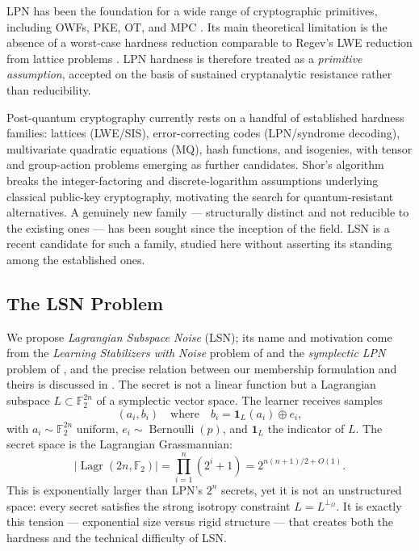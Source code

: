 \documentclass[11pt,a4paper]{article}
\theoremstyle{plain}
\theoremstyle{definition}
\newcommand{\F}{\mathbb{F}}
\DeclareMathOperator{\Lagr}{Lagr}
\begin{document}
LPN has been the foundation for a wide range of cryptographic primitives, including OWFs, PKE, OT, and MPC \cite{ABW10,Ale11,DGM12,BCGI18}. Its main theoretical limitation is the absence of a worst-case hardness reduction comparable to Regev's LWE reduction from lattice problems \cite{Reg05}. LPN hardness is therefore treated as a \emph{primitive assumption}, accepted on the basis of sustained cryptanalytic resistance rather than reducibility.

Post-quantum cryptography currently rests on a handful of established hardness families: lattices (LWE/SIS), error-correcting codes (LPN/syndrome decoding), multivariate quadratic equations (MQ), hash functions, and isogenies, with tensor and group-action problems emerging as further candidates. Shor's algorithm \cite{Sho94} breaks the integer-factoring and discrete-logarithm assumptions underlying classical public-key cryptography, motivating the search for quantum-resistant alternatives. A genuinely new family --- structurally distinct and not reducible to the existing ones --- has been sought since the inception of the field. LSN is a recent candidate for such a family, studied here without asserting its standing among the established ones.

\subsection{The LSN Problem}
\label{subsec:lsn}

We propose \emph{Lagrangian Subspace Noise} (LSN); its name and motivation come from the \emph{Learning Stabilizers with Noise} problem of \cite{PQS26} and the \emph{symplectic LPN} problem of \cite{KLP+25,LPQR26}, and the precise relation between our membership formulation and theirs is discussed in . The secret is not a linear function but a Lagrangian subspace $L \subset \F_2^{2n}$ of a symplectic vector space. The learner receives samples
\[
(a_i, b_i) \quad \text{where} \quad b_i = \mathbf{1}_L(a_i) \oplus e_i,
\]
with $a_i \sim \F_2^{2n}$ uniform, $e_i \sim \operatorname{Bernoulli}(p)$, and $\mathbf{1}_L$ the indicator of $L$. The secret space is the Lagrangian Grassmannian:
\begin{equation}
\label{eq:lagr-count}
|\Lagr(2n, \F_2)| = \prod_{i=1}^n (2^i + 1) = 2^{n(n+1)/2 + O(1)}.
\end{equation}
This is exponentially larger than LPN's $2^n$ secrets, yet it is not an unstructured space: every secret satisfies the strong isotropy constraint $L = L^{\perp_\Omega}$. It is exactly this tension --- exponential size versus rigid structure --- that creates both the hardness and the technical difficulty of LSN.
\end{document}
